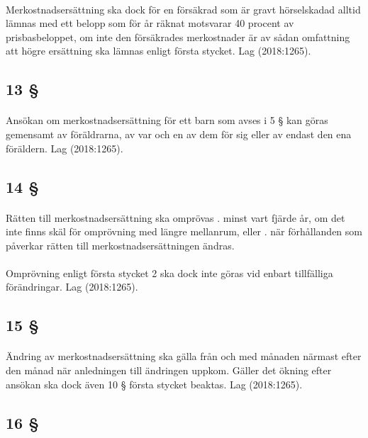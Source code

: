 \documentclass[a4paper,notitlepage,openany,10pt]{book}
\begin{document}
\paragraph*{}
Merkostnadsersättning ska dock för en försäkrad som är gravt hörselskadad alltid lämnas med ett belopp som för år räknat motsvarar 40 procent av prisbasbeloppet, om inte den försäkrades merkostnader är av sådan omfattning att högre ersättning ska lämnas enligt första stycket.
Lag (2018:1265).
\subsection*{13 §}
\paragraph*{}
Ansökan om merkostnadsersättning för ett barn som avses i 5 § kan göras gemensamt av föräldrarna, av var och en av dem för sig eller av endast den ena föräldern.
Lag (2018:1265).
\subsection*{14 §}
\paragraph*{}
Rätten till merkostnadsersättning ska omprövas
. minst vart fjärde år, om det inte finns skäl för omprövning med längre mellanrum, eller
. när förhållanden som påverkar rätten till merkostnadsersättningen ändras.
\paragraph*{}
Omprövning enligt första stycket 2 ska dock inte göras vid enbart tillfälliga förändringar.
Lag (2018:1265).
\subsection*{15 §}
\paragraph*{}
Ändring av merkostnadsersättning ska gälla från och med månaden närmast efter den månad när anledningen till ändringen uppkom. Gäller det ökning efter ansökan ska dock även 10 § första stycket beaktas.
Lag (2018:1265).
\subsection*{16 §}
\end{document}
